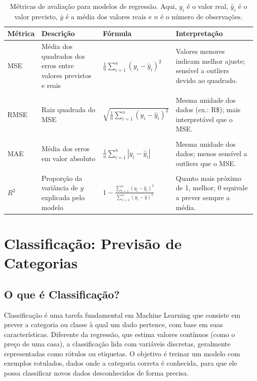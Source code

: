 \documentclass[a4paper,12pt,openany]{book}
\begin{document}
\begin{table}[H]
\centering
\begin{tabular}{p{1.6cm} p{3.2cm} p{4.2cm} p{4cm}}
\toprule
\textbf{Métrica} & \textbf{Descrição} & \textbf{Fórmula} & \textbf{Interpretação} \\ 
\midrule
MSE & Média dos quadrados dos erros entre valores previstos e reais & \(\frac{1}{n} \sum_{i=1}^{n} (y_i - \hat{y}_i)^2 \) & Valores menores indicam melhor ajuste; sensível a outliers devido ao quadrado. \\
 \\ 
RMSE & Raiz quadrada do MSE & \(\sqrt{\frac{1}{n} \sum_{i=1}^{n} (y_i - \hat{y}_i)^2} \) & Mesma unidade dos dados (ex.: R\$); mais interpretável que o MSE. \\ 
 \\ 
MAE & Média dos erros em valor absoluto & \(\frac{1}{n} \sum_{i=1}^{n} |y_i - \hat{y}_i| \) & Mesma unidade dos dados; menos sensível a outliers que o MSE. \\
 \\ 
\(R^2\) & Proporção da variância de \(y\) explicada pelo modelo & \(1 - \frac{\sum_{i=1}^{n} (y_i - \hat{y}_i)^2}{\sum_{i=1}^{n} (y_i - \bar{y})^2} \) & Quanto mais próximo de 1, melhor; 0 equivale a prever sempre a média. \\
\bottomrule
\end{tabular}
\caption{Métricas de avaliação para modelos de regressão. Aqui, \(y_i\) é o valor real, \(\hat{y}_i\) é o valor previsto, \(\bar{y}\) é a média dos valores reais e \(n\) é o número de observações.}
\label{tab:metricas_regressao}
\end{table}

\chapter{Classificação: Previsão de Categorias}\label{cap:classificacao}

\section{O que é Classificação?}

Classificação é uma tarefa fundamental em Machine Learning que consiste em prever a categoria ou classe à qual um dado pertence, com base em suas características. Diferente da regressão, que estima valores contínuos (como o preço de uma casa), a classificação lida com variáveis discretas, geralmente representadas como rótulos ou etiquetas. O objetivo é treinar um modelo com exemplos rotulados, dados onde a categoria correta é conhecida, para que ele possa classificar novos dados desconhecidos de forma precisa.
\end{document}
